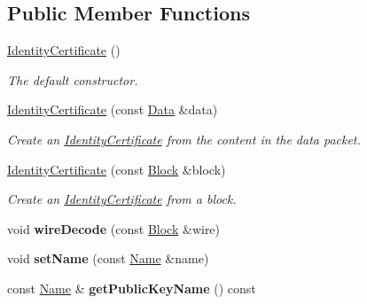 \subsection*{Public Member Functions}
\begin{DoxyCompactItemize}
\item 
\hyperlink{classndn_1_1IdentityCertificate_a389340a7c76bf11065eba17a3849ca03}{Identity\+Certificate} ()\hypertarget{classndn_1_1IdentityCertificate_a389340a7c76bf11065eba17a3849ca03}{}\label{classndn_1_1IdentityCertificate_a389340a7c76bf11065eba17a3849ca03}

\begin{DoxyCompactList}\small\item\em The default constructor. \end{DoxyCompactList}\item 
\hyperlink{classndn_1_1IdentityCertificate_a8e586362bb73010e1b952460f23b6ca4}{Identity\+Certificate} (const \hyperlink{classndn_1_1Data}{Data} \&data)
\begin{DoxyCompactList}\small\item\em Create an \hyperlink{classndn_1_1IdentityCertificate}{Identity\+Certificate} from the content in the data packet. \end{DoxyCompactList}\item 
\hyperlink{classndn_1_1IdentityCertificate_a90d5307d47ce14d6149fc94132e89dd2}{Identity\+Certificate} (const \hyperlink{classndn_1_1Block}{Block} \&block)
\begin{DoxyCompactList}\small\item\em Create an \hyperlink{classndn_1_1IdentityCertificate}{Identity\+Certificate} from a block. \end{DoxyCompactList}\item 
void {\bfseries wire\+Decode} (const \hyperlink{classndn_1_1Block}{Block} \&wire)\hypertarget{classndn_1_1IdentityCertificate_a46469492d51405b9ce67334b849dac8e}{}\label{classndn_1_1IdentityCertificate_a46469492d51405b9ce67334b849dac8e}

\item 
void {\bfseries set\+Name} (const \hyperlink{classndn_1_1Name}{Name} \&name)\hypertarget{classndn_1_1IdentityCertificate_a7f29a8907c271109cd713e0d55d45f89}{}\label{classndn_1_1IdentityCertificate_a7f29a8907c271109cd713e0d55d45f89}

\item 
const \hyperlink{classndn_1_1Name}{Name} \& {\bfseries get\+Public\+Key\+Name} () const\hypertarget{classndn_1_1IdentityCertificate_aebc53b9ffab92d0617831aa25ba4957c}{}\label{classndn_1_1IdentityCertificate_aebc53b9ffab92d0617831aa25ba4957c}

\end{DoxyCompactItemize}
